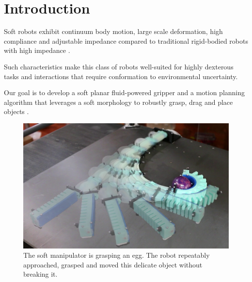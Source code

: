 \section{Introduction}

Soft robots exhibit continuum body motion, large scale deformation, high compliance and adjustable impedance  compared to traditional rigid-bodied robots with high impedance \cite{trivedi2008soft}. 

Such characteristics make this class of robots well-suited for highly dexterous tasks and interactions that require conformation to environmental uncertainty.

Our goal is to develop a soft planar fluid-powered gripper and a motion planning algorithm that leverages a soft morphology to robustly grasp, drag and place objects . 

\begin{figure}[htb]
\centering
   \includegraphics[width=0.99\columnwidth]{Figures/experimental_results/egg_approach/egg_approach_sequence_brighter}
   \caption{The soft manipulator is grasping an egg. The robot repeatably approached, grasped and moved this delicate object without breaking it.}
   \label{fig:egg_approach_sequence}
\end{figure}


